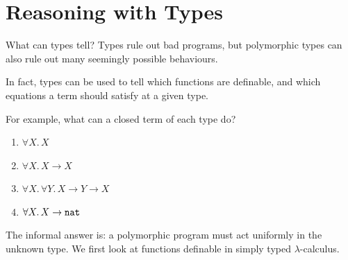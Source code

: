 \section{Reasoning with Types}

\begin{frame}{What can types tell?}
  Types rule out bad programs, but polymorphic types can also rule out many
  seemingly possible behaviours.

  In fact, types can be used to tell which functions are definable, and which
  equations a term should satisfy at a given type.

  \vfill

  For example, what can a closed term of each type do?
  \begin{enumerate}
    \item $\forall X.\,X$
    \item $\forall X.\,X \to X$
    \item $\forall X.\,\forall Y.\,X \to Y \to X$
    \item $\forall X.\,X \to \mathtt{nat}$
  \end{enumerate}

  \vfill

  The informal answer is: a polymorphic program must act uniformly in the
  unknown type.  We first look at functions definable in simply typed
  $\lambda$-calculus.
\end{frame}

